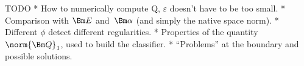 
\Red

\noindent TODO
\begitems
* How to numerically compute Q, $\varepsilon$ doesn't have to be too small.
* Comparison with $\Bm E$ and~$\Bm\alpha$ (and simply the native space norm).
* Different $\phi$ detect different regularities.
* Properties of the quantity~$\norm{\Bm Q}_1$, used to build the classifier.
* ``Problems'' at the boundary and possible solutions.
\enditems



\Black



